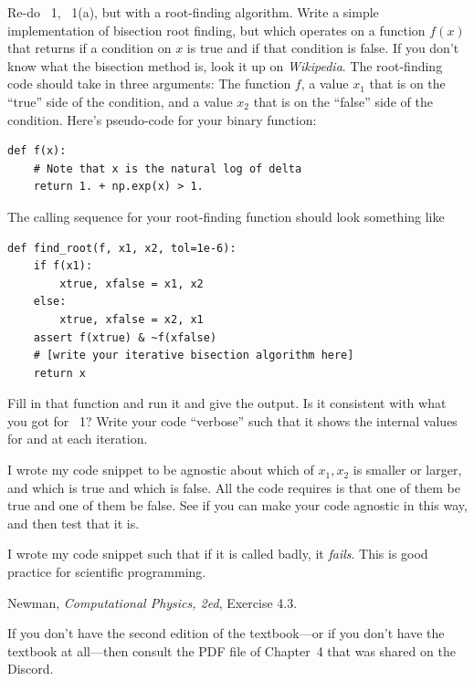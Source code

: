 \documentclass[12pt]{article}
\begin{document}
\begin{problem}
  Re-do \psname~1, \problemname~1(a), but with a root-finding algorithm.
  Write a simple implementation of bisection root finding, but which operates on a function $f(x)$ that returns  if a condition on $x$ is true and  if that condition is false.
  If you don't know what the bisection method is, look it up on \textit{Wikipedia}.
  The root-finding code should take in three arguments: The function $f$, a value $x_1$ that is on the ``true'' side of the condition, and a value $x_2$ that is on the ``false'' side of the condition.
  Here's pseudo-code for your binary function:
\begin{lstlisting}
def f(x):
    # Note that x is the natural log of delta
    return 1. + np.exp(x) > 1.
\end{lstlisting}
  The calling sequence for your root-finding function should look something like
\begin{lstlisting}
def find_root(f, x1, x2, tol=1e-6):
    if f(x1):
        xtrue, xfalse = x1, x2
    else:
        xtrue, xfalse = x2, x1
    assert f(xtrue) & ~f(xfalse)
    # [write your iterative bisection algorithm here]
    return x
\end{lstlisting}
Fill in that function and run it and give the output.
Is it consistent with what you got for \psname~1?
Write your code ``verbose'' such that it shows the internal values for  and  at each iteration.
\end{problem}

\begin{note}
  I wrote my code snippet to be agnostic about which of $x_1,x_2$ is smaller or larger, and which is true and which is false.
  All the code requires is that one of them be true and one of them be false.
  See if you can make your code agnostic in this way, and then test that it is.
\end{note}

\begin{note}
  I wrote my code snippet such that if it is called badly, it \emph{fails}.
  This is good practice for scientific programming.
\end{note}

\begin{problem}
  Newman, \textit{Computational Physics, 2ed}, Exercise 4.3.
\end{problem}

\begin{note}
  If you don't have the second edition of the textbook---or if you don't have the textbook at all---then consult the PDF file of Chapter~4 that was shared on the Discord.
\end{note}
\end{document}
